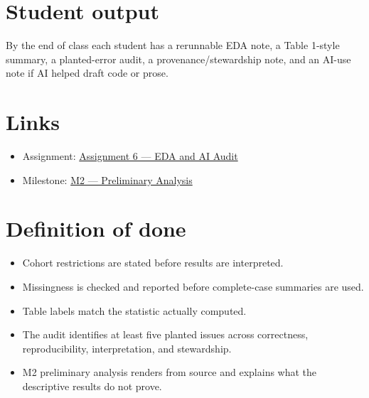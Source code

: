 \documentclass[
  letterpaper,
  DIV=11,
  numbers=noendperiod,
  oneside]{scrreprt}
\providecommand{\tightlist}{%
  \setlength{\itemsep}{0pt}\setlength{\parskip}{0pt}}
\begin{document}
\section*{Student output}\label{student-output-4}


By the end of class each student has a rerunnable EDA note, a Table
1-style summary, a planted-error audit, a provenance/stewardship note,
and an AI-use note if AI helped draft code or prose.

\section*{Links}\label{links-1}


\begin{itemize}
\tightlist
\item
  Assignment:
  \href{../../assignments/assignment06-eda-ai-audit/README.md}{Assignment
  6 --- EDA and AI Audit}
\item
  Milestone:
  \href{../../milestones/m2-preliminary-analysis/README.md}{M2 ---
  Preliminary Analysis}
\end{itemize}

\section*{Definition of done}\label{definition-of-done-3}


\begin{itemize}
\tightlist
\item
  Cohort restrictions are stated before results are interpreted.
\item
  Missingness is checked and reported before complete-case summaries are
  used.
\item
  Table labels match the statistic actually computed.
\item
  The audit identifies at least five planted issues across correctness,
  reproducibility, interpretation, and stewardship.
\item
  M2 preliminary analysis renders from source and explains what the
  descriptive results do not prove.
\end{itemize}
\end{document}
